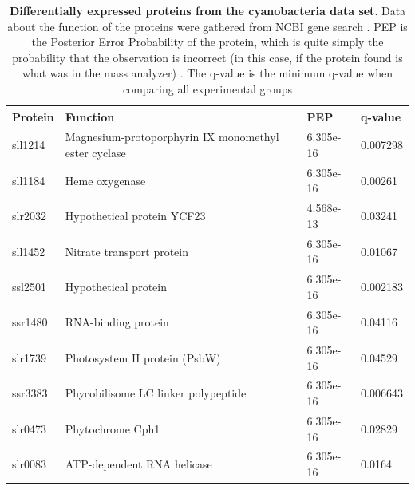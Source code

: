 \begin{center}
\begin{table}[H]
\caption{\textbf{Differentially expressed proteins from the cyanobacteria data set}. Data about the function of the proteins were gathered from NCBI gene search \cite{ncbi-search}. PEP is the Posterior Error Probability of the protein, which is quite simply the probability that the observation is incorrect (in this case, if the protein found is what was in the mass analyzer) \cite{q-value}. The q-value is the minimum q-value when comparing all experimental groups}
\begin{tabular}{ l l l l }
\toprule
Protein & Function & PEP & q-value \\  \midrule
sll1214 & Magnesium-protoporphyrin IX monomethyl ester cyclase  & 6.305e-16 & 0.007298 \\ [0.5ex]
sll1184 & Heme oxygenase & 6.305e-16 & 0.00261 \\ [0.5ex]
slr2032 & Hypothetical protein YCF23 & 4.568e-13 & 0.03241 \\ [0.5ex]
sll1452 & Nitrate transport protein & 6.305e-16 & 0.01067 \\ [0.5ex]
ssl2501 & Hypothetical protein & 6.305e-16 & 0.002183 \\ [0.5ex]
ssr1480 & RNA-binding protein  & 6.305e-16 & 0.04116 \\ [0.5ex]
slr1739 & Photosystem II protein (PsbW) & 6.305e-16 & 0.04529 \\ [0.5ex]
ssr3383 & Phycobilisome LC linker polypeptide & 6.305e-16 & 0.006643 \\ [0.5ex]
slr0473 & Phytochrome Cph1 & 6.305e-16 & 0.02829 \\ [0.5ex]
slr0083 & ATP-dependent RNA helicase  & 6.305e-16 & 0.0164 \\ [0.5ex] \bottomrule
\end{tabular}
\centering
\label{table:cyano-proteins}
\end{table}
\end{center}

